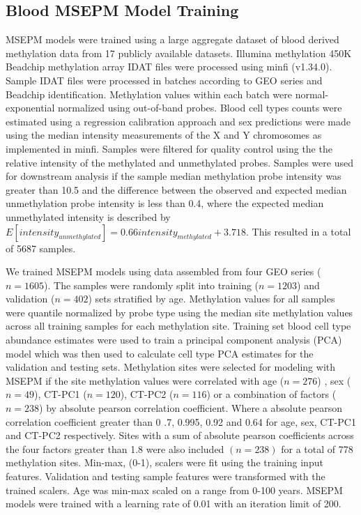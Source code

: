 \documentclass[sn-nature]{sn-jnl}
\begin{document}
{\begin{linenumbers}
\subsection{Blood MSEPM Model Training}
MSEPM models were trained using a large aggregate dataset of blood derived methylation data from 17 publicly available 
datasets\cite{Ventham2016-qj,Demetriou2013-wb,Polidoro2013-xv,Johansson2013-of,Arloth2020-lo,Liu2013-dg,Soriano-Tarraga2016-uq,Chuang2017-nk,
Zannas2019-me,Kurushima2019-pe,Voisin2015-lh,Tan2014-sg,Tserel2015-ro,Butcher2017-oz,Dabin2020-iw,Marabita2013-cj,ValleG2019-xi}. 
Illumina methylation 450K Beadchip methylation array IDAT files were processed using minfi\cite{Aryee2014-ky} (v1.34.0). 
Sample IDAT files were processed in batches according to GEO series and Beadchip  identification. Methylation values within 
each batch were normal-exponential normalized using out-of-band probes\cite{Triche2013-pp}. Blood cell types counts were estimated 
using a regression calibration approach\cite{Houseman2012-rr} and sex predictions were made using the median intensity measurements
of the X and Y chromosomes as implemented in minfi\cite{Aryee2014-ky}. Samples were filtered for quality control using the the relative 
intensity of the methylated and unmethylated probes. Samples were used for downstream analysis if the sample median 
methylation probe intensity was greater than 10.5 and the difference between the observed and expected median 
unmethylation probe intensity is less than 0.4, where the expected median unmethylated intensity is described by 
$E[intensity_{unmethylated}] = 0.66 intensity_{methylated} + 3.718$. This resulted in a total of 5687 samples. 

We trained MSEPM models using data assembled from four GEO series\cite{Johansson2013-of,Liu2013-dg,Butcher2017-oz,Damaso2020-gd}  ($n=1605$). 
The samples were randomly split into training ($n=1203$) and validation ($n=402$) sets stratified by age. Methylation values for all 
samples were quantile normalized by probe type\cite{Horvath2013-sk} using the median site methylation values across all training samples for each methylation site.
Training set blood cell type abundance estimates were used to train a principal component analysis (PCA) model which was then used to calculate cell 
type PCA estimates for the validation and testing sets. Methylation sites were selected for modeling with MSEPM if the site methylation values were correlated with age ($n=276$) , 
sex ($n=49$), CT-PC1 ($n=120$), CT-PC2 ($n=116$) or a combination of factors ($n=238$) by absolute pearson correlation coefficient. Where a absolute pearson correlation coefficient greater than 0
.7, 0.995, 0.92 and 0.64 for age, sex, CT-PC1 and CT-PC2 respectively. Sites with a sum of absolute pearson coefficients across the four factors greater than 1.8 were also included $(n=238)$ 
for a total of 778 methylation sites. Min-max, (0-1), scalers were fit using the training input features. Validation and testing sample features were transformed with the trained scalers. Age was min-max 
scaled on a range from 0-100 years. MSEPM models were trained with a learning rate of 0.01 with an iteration limit of 200. 


\end{linenumbers}}
\end{document}
